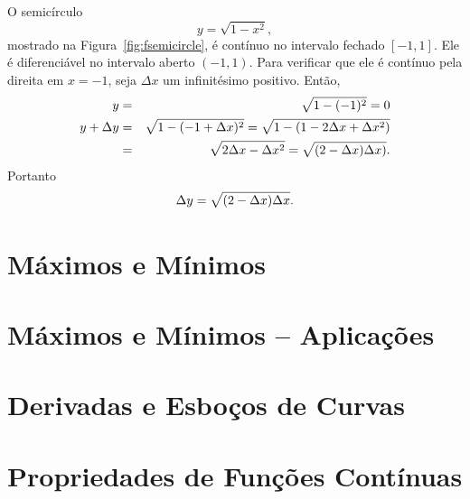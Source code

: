 \begin{example}
  O semicírculo
  $$
    y = \sqrt{1 - x^2},
  $$
  mostrado na Figura~\ref{fig:fsemicircle}, é contínuo no intervalo fechado
  $[-1, 1]$. Ele é diferenciável no intervalo aberto $(-1, 1)$. Para
  verificar que ele é contínuo pela direita em $x = -1$, seja $\Delta x$
  um infinitésimo positivo. Então,
  \begin{eqnarray*}
    y & = & \sqrt{1 - (-1)^2} = 0 \\
    y + \Delta y & = & \sqrt{1 - (-1 + \Delta x)^2} = \sqrt{1 - (1 - 2\Delta x + \Delta x^2)} \\
    & = & \sqrt{2 \Delta x - \Delta x^2} = \sqrt{(2 - \Delta x)\Delta x)}.
  \end{eqnarray*}
  Portanto
  $$
    \Delta y = \sqrt{(2-\Delta x)\Delta x}.
  $$
\end{example}


\section{Máximos e Mínimos}
\label{sec:maxmin}

\section{Máximos e Mínimos -- Aplicações}
\label{sec:maxminappl}

\section{Derivadas e Esboços de Curvas}
\label{sec:derivsketch}

\section{Propriedades de Funções Contínuas}
\label{sec:propcont}

\begin{chapterproblems}
\end{chapterproblems}
